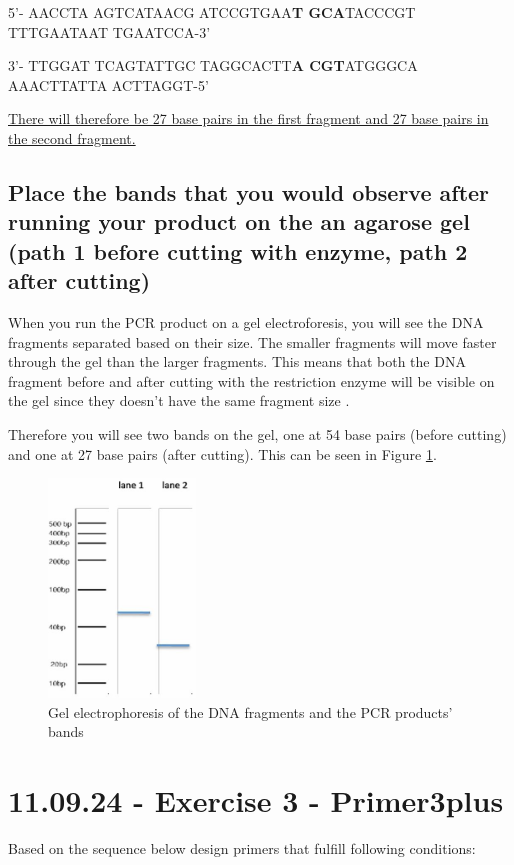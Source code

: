 5'- AACCTA AGTCATAACG ATCCGTGAA\textbf{T GCA}TACCCGT TTTGAATAAT TGAATCCA-3'

3'- TTGGAT TCAGTATTGC TAGGCACTT\textbf{A CGT}ATGGGCA AAACTTATTA ACTTAGGT-5'

\vspace{1em}   
\underline{There will therefore be 27 base pairs in the first fragment and 27 base pairs in the second fragment.}

\subsection{Place the bands that you would observe after running your product on the an agarose gel (path 1 before cutting with enzyme, path 2 after cutting)}

When you run the PCR product on a gel electroforesis, you will see the DNA fragments separated based on their size. The smaller fragments will move faster through the gel than the larger fragments. This means that both the DNA fragment before and after cutting with the restriction enzyme will be visible on the gel since they doesn't have the same fragment size   .

Therefore you will see two bands on the gel, one at 54 base pairs (before cutting) and one at 27 base pairs (after cutting).
This can be seen in Figure \ref{fig:Exercise2Gel}.
\clearpage
\begin{figure}[t]
    \centering
    \includegraphics[angle=270, width=0.35\textwidth]{Figures/Exc2Gel.JPG}
    \caption{Gel electrophoresis of the DNA fragments and the PCR products' bands}
    \label{fig:Exercise2Gel}
\end{figure}

\section{11.09.24 - Exercise 3 - Primer3plus}
Based on the sequence below design primers that fulfill following conditions:

